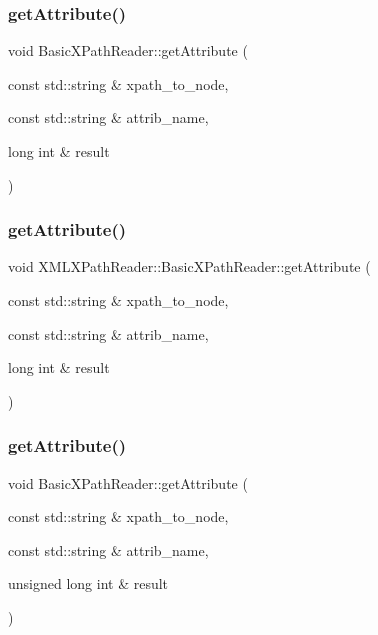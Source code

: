 \subsubsection{\texorpdfstring{getAttribute()}{getAttribute()}\hspace{0.1cm}{\footnotesize\ttfamily [11/20]}}
{\footnotesize\ttfamily void Basic\+X\+Path\+Reader\+::get\+Attribute (\begin{DoxyParamCaption}\item[{const std\+::string \&}]{xpath\+\_\+to\+\_\+node,  }\item[{const std\+::string \&}]{attrib\+\_\+name,  }\item[{long int \&}]{result }\end{DoxyParamCaption})}

\mbox{\label{classXMLXPathReader_1_1BasicXPathReader_a93aba6e8e1f1bb9ea9646fd9c785ba17}} 
\subsubsection{\texorpdfstring{getAttribute()}{getAttribute()}\hspace{0.1cm}{\footnotesize\ttfamily [12/20]}}
{\footnotesize\ttfamily void X\+M\+L\+X\+Path\+Reader\+::\+Basic\+X\+Path\+Reader\+::get\+Attribute (\begin{DoxyParamCaption}\item[{const std\+::string \&}]{xpath\+\_\+to\+\_\+node,  }\item[{const std\+::string \&}]{attrib\+\_\+name,  }\item[{long int \&}]{result }\end{DoxyParamCaption})}

\mbox{\label{classXMLXPathReader_1_1BasicXPathReader_ab109aaf673ecf809456c7f070e4cb046}} 
\subsubsection{\texorpdfstring{getAttribute()}{getAttribute()}\hspace{0.1cm}{\footnotesize\ttfamily [13/20]}}
{\footnotesize\ttfamily void Basic\+X\+Path\+Reader\+::get\+Attribute (\begin{DoxyParamCaption}\item[{const std\+::string \&}]{xpath\+\_\+to\+\_\+node,  }\item[{const std\+::string \&}]{attrib\+\_\+name,  }\item[{unsigned long int \&}]{result }\end{DoxyParamCaption})}

